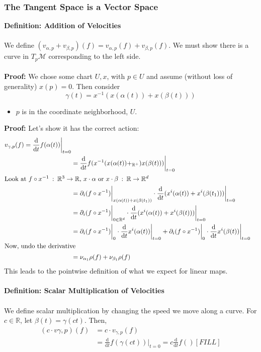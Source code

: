 \documentclass[10pt]{article}
\newcommand{\R}{\mathbb{R}}
\begin{document}
\subsubsection*{The Tangent Space is a Vector Space}
\textbf{Definition: Addition of Velocities}\\\\
We define $(v_{\alpha, p} + v_{\beta, p})(f) = v_{\alpha, p}(f) + v_{\beta, p}(f)$.  We must show there is a curve in $T_p \mathcal{M}$ corresponding to the left side.\\\\
\textbf{Proof:}  We chose some chart $U, x$, with $p \in U$ and assume (without loss of generality) $x(p) = 0$.  Then consider
\[\gamma(t) = x^{-1}(x(\alpha(t)) + x(\beta(t)))\]
\begin{itemize}
    \item $p$ is in the coordinate neighborhood, $U$.
\end{itemize}
\textbf{Proof:}
Let's show it has the correct action:
\begin{align*}
    v_{\gamma, p} (f) = \frac{\text{d}}{\text{d}t} f(\alpha(t)) \bigg|_{t = 0} \\
    &= \frac{\text{d}}{\text{d}t} f(x^{-1}(x(\alpha(t)) +_{\mathbb{R}^+}) x(\beta(t)))\bigg|_{t = 0}\\
    \intertext{Look at $f \circ x^{-1}\::\: \R^3 \rightarrow \R$, $x \cdot \alpha$ or $x \cdot \beta \::\: \R \rightarrow \R^d$}
    &= \partial_i (f \circ x^{-1}) \bigg|_{x(\alpha(t)) + x(\beta(t_1))} \cdot \frac{\text{d}}{\text{d}t} (x^i (\alpha(t)) + x^i(\beta(t_1))) \bigg|_{t = 0}\\
    &= \partial_i (f \circ x^{-1}) \bigg|_{0 \in \mathbb{R}^d} \cdot \frac{\text{d}}{\text{d}t}(x^i(\alpha(t)) + x^i(\beta(t))) \bigg|_{t = 0}\\
    &= \partial_i (f \circ x^{-1}) \bigg|_{0} \cdot \frac{\text{d}}{\text{d}t} x^i(\alpha(t)) \bigg|_{t=0} + \partial_i (f \circ x^{-1}) \bigg|_0 \cdot \frac{\text{d}}{\text{d}t} x^i (\beta(t))\bigg|_{t=0}\\
    \intertext{Now, undo the derivative}
    &= \nu_{\alpha_1} \rho(f) + \nu_{\beta_1} \rho(f) 
\end{align*}
This leads to the pointwise definition of what we expect for linear maps.\\\\
\textbf{Definition: Scalar Multiplication of Velocities}\\\\
We define scalar multiplication by changing the speed we move along a curve.  For $c \in \R$, let $\beta(t) = \gamma(ct)$.  Then,
\begin{align*}
    (c \cdot v{\gamma, p})(f) &= c \cdot v_{\gamma, p}(f)\\
    &= \frac{\text{d}}{\text{d}t} f(\gamma(ct)) \bigg|_{t = 0} = c \frac{\text{d}}{\text{d}t} f()
    [FILL]
\end{align*}
\end{document}
